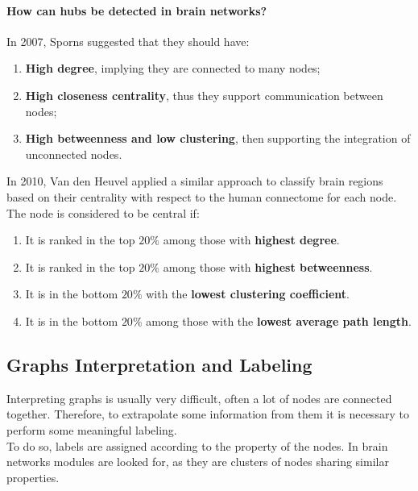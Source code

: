 \paragraph{How can hubs be detected in brain networks?} In 2007, Sporns suggested that they should have:
\begin{enumerate}
    \item \textbf{High degree}, implying they are connected to many nodes;
    \item \textbf{High closeness centrality}, thus they support communication between nodes;
    \item \textbf{High betweenness and low clustering}, then supporting the integration of unconnected nodes.
\end{enumerate}
In 2010, Van den Heuvel applied a similar approach to classify brain regions based on their centrality with respect to
the human connectome for each node. The node is considered to be central if:
\begin{enumerate}
    \item It is ranked in the top \(20\%\) among those with \textbf{highest degree}.
    \item It is ranked in the top \(20\%\) among those with \textbf{highest betweenness}.
    \item It is in the bottom \(20\%\) with the \textbf{lowest clustering coefficient}.
    \item It is in the bottom \(20\%\) among those with the \textbf{lowest average path length}.
\end{enumerate}

\subsection{Graphs Interpretation and Labeling}
Interpreting graphs is usually very difficult, often a lot of nodes are connected together. Therefore, to extrapolate
some information from them it is necessary to perform some meaningful labeling.\\
To do so, labels are assigned according to the property of the nodes. In brain networks modules are looked for, as they
are clusters of nodes sharing similar properties.
